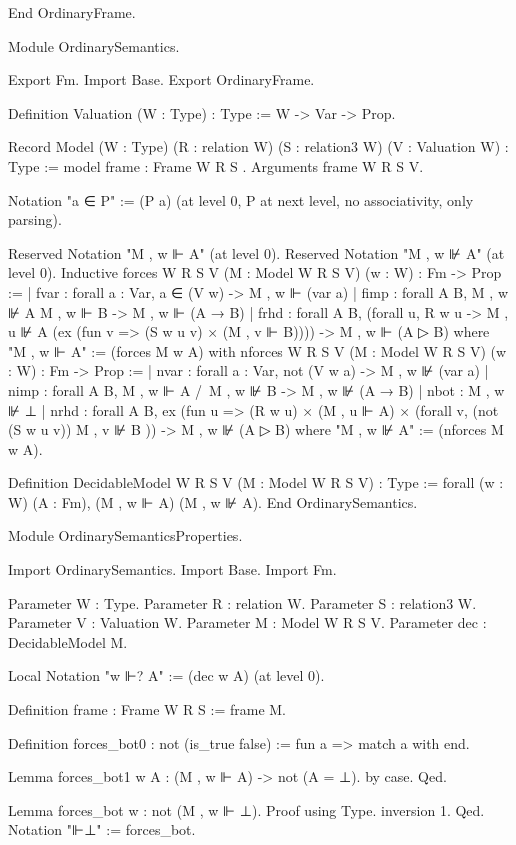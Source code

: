 \begin{spverbatim}
End OrdinaryFrame.

Module OrdinarySemantics.

Export Fm.
Import Base.
Export OrdinaryFrame.

Definition Valuation (W : Type) : Type := W -> Var -> Prop.

Record Model (W : Type) (R : relation W) (S : relation3 W) (V : Valuation W) : Type :=
  model {
      frame : Frame W R S
    }.
Arguments frame {W} {R} {S} {V}.

Notation "a ∈ P" := (P a) (at level 0, P at next level, no associativity, only parsing).

Reserved Notation "M , w ⊩ A"  (at level 0).
Reserved Notation "M , w ⊮ A"  (at level 0).
Inductive forces {W R S V} (M : Model W R S V) (w : W) : Fm -> Prop :=
  | fvar : forall {a : Var}, a ∈ (V w) -> M , w ⊩ (var a)
  | fimp : forall {A B}, M , w ⊮ A \/ M , w ⊩ B -> M , w ⊩ (A → B)
  | frhd : forall {A B}, (forall {u}, R w u -> M , u ⊮ A \/ (ex (fun v => (S w u v) × (M , v ⊩ B))))
                  -> M , w ⊩ (A ▷ B)
where "M , w ⊩ A" := (forces M w A)
with nforces {W R S V} (M : Model W R S V) (w : W) : Fm -> Prop :=
  | nvar : forall {a : Var}, not (V w a) -> M , w ⊮ (var a)
  | nimp : forall {A B}, M , w ⊩ A /\ M , w ⊮ B -> M , w ⊮ (A → B)
  | nbot : M , w ⊮ ⊥
  | nrhd : forall {A B},
      ex (fun u => (R w u) × (M , u ⊩ A) ×
           (forall v, (not (S w u v)) \/ M , v ⊮ B )) -> M , w ⊮ (A ▷ B)
where "M , w ⊮ A" := (nforces M w A).

Definition DecidableModel {W R S V} (M : Model W R S V) : Type :=
  forall (w : W) (A : Fm), (M , w ⊩ A) \/ (M , w ⊮ A).
End OrdinarySemantics.

Module OrdinarySemanticsProperties.

Import OrdinarySemantics.
Import Base.
Import Fm.

Parameter W : Type.
Parameter R : relation W.
Parameter S : relation3 W.
Parameter V : Valuation W.
Parameter M : Model W R S V.
Parameter dec : DecidableModel M.

Local Notation "w ⊩? A" := (dec w A) (at level 0).

Definition frame : Frame W R S := frame M.

Definition forces_bot0 : not (is_true false) :=
  fun a => match a with end.

Lemma forces_bot1 {w A} : (M , w ⊩ A) -> not (A = ⊥).
  by case.
Qed.

Lemma forces_bot {w} : not (M , w ⊩ ⊥).
Proof using Type.
  inversion 1. Qed.
Notation "⊩⊥" := forces_bot.


\end{spverbatim}
